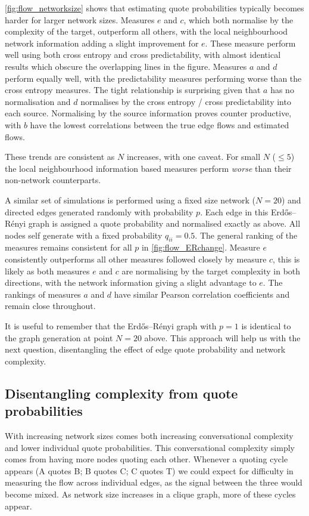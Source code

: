 \autoref{fig:flow_networksize} shows that estimating quote probabilities typically becomes harder for larger network sizes. %
Measures $e$ and $c$, which both normalise by the complexity of the target, outperform all others, with the local neighbourhood network information adding a slight improvement for $e$. These measure perform well using both cross entropy and cross predictability, with almost identical results which obscure the overlapping lines in the figure. Measures $a$ and $d$ perform equally well, with the predictability measures performing worse than the cross entropy measures. The tight relationship is surprising given that $a$ has no normalisation and $d$ normalises by the cross entropy / cross predictability into each source. Normalising by the source information proves counter productive, with $b$ have the lowest correlations between the true edge flows and estimated flows.

These trends are consistent as $N$ increases, with one caveat. For small $N$ ($\leq 5$) the local neighbourhood information based measures perform \emph{worse} than their non-network counterparts. %

A similar set of simulations is performed using a fixed size network ($N=20$) and directed edges generated randomly with probability $p$. Each edge in this Erdős–Rényi graph is assigned a quote probability and normalised exactly as above. All nodes self generate with a fixed probability $q_{ii}=0.5$. The general ranking of the measures remains consistent for all $p$ in \autoref{fig:flow_ERchange}. Measure $e$ consistently outperforms all other measures followed closely by measure $c$, this is likely as both measures $e$ and $c$ are normalising by the target complexity in both directions, with the network information giving a slight advantage to $e$. The rankings of measures $a$ and $d$ have similar Pearson correlation coefficients and remain close throughout. 

It is useful to remember that the Erdős–Rényi graph with $p=1$ is identical to the graph generation at point $N=20$ above. This approach will help us with the next question, disentangling the effect of edge quote probability and network complexity.   

\subsection{Disentangling complexity from quote probabilities}\label{sec:low_quote_probs}
With increasing network sizes comes both increasing conversational complexity and lower individual quote probabilities. This conversational complexity simply comes from having more nodes quoting each other. Whenever a quoting cycle appears (A quotes B; B quotes C; C quotes T) we could expect for difficulty in measuring the flow across individual edges, as the signal between the three would become mixed. As network size increases in a clique graph, more of these cycles appear.  

